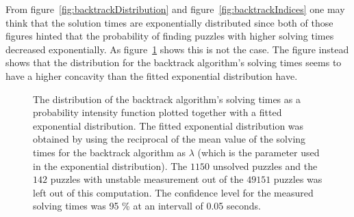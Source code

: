 \documentclass[a4paper,11pt]{kth-mag}
\begin{document}
\FloatBarrier
From figure~\ref{fig:backtrackDistribution} and figure~\ref{fig:backtrackIndices} one may think that the solution times are exponentially distributed since both of those figures hinted that the probability of finding puzzles with higher solving times decreased exponentially.
As figure~\ref{fig:backtrackExponential} shows this is not the case.
The figure instead shows that the distribution for the backtrack algorithm's solving times seems to have a higher concavity than the fitted exponential distribution have.

\begin{figure}[here] 
\noindent{}
\vspace{-15pt}
\caption{The distribution of the backtrack algorithm's solving times as a probability intensity function plotted together with a fitted exponential distribution. 
The fitted exponential distribution was obtained by using the reciprocal of the mean value of the solving times for the backtrack algorithm as $\lambda$ (which is the parameter used in the exponential distribution). 
The $1150$ unsolved puzzles and the $142$ puzzles with unstable measurement out of the $49151$ puzzles was left out of this computation. 
The confidence level for the measured solving times was 95 \% at an intervall of 0.05 seconds.}
\label{fig:backtrackExponential}
\end{figure}

\FloatBarrier
\end{document}
